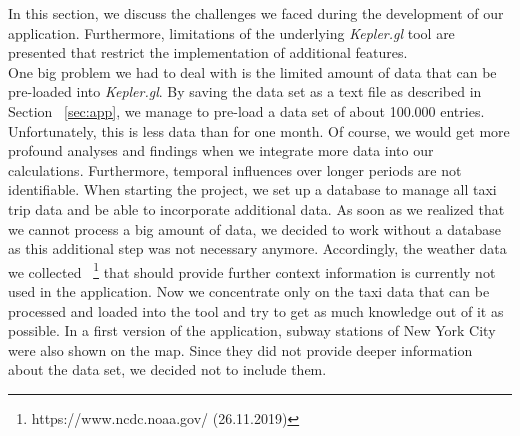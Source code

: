 \documentclass[sigconf, authorversion, nonacm=true]{acmart}
\begin{document}
In this section, we discuss the challenges we faced during the development of our application. Furthermore, limitations of the underlying \textit{Kepler.gl} tool are presented that restrict the implementation of additional features.\\
One big problem we had to deal with is the limited amount of data that can be pre-loaded into \textit{Kepler.gl}. By saving the data set as a text file as described in Section ~\ref{sec:app}, we manage to pre-load a data set of about 100.000 entries. Unfortunately, this is less data than for one month. Of course, we would get more profound analyses and findings when we integrate more data into our calculations. Furthermore, temporal influences over longer periods are not identifiable. When starting the project, we set up a database to manage all taxi trip data and be able to incorporate additional data. As soon as we realized that we cannot process a big amount of data, we decided to work without a database as this additional step was not necessary anymore. Accordingly, the weather data we collected ~\footnote{https://www.ncdc.noaa.gov/ (26.11.2019)} that should provide further context information is currently not used in the application. Now we concentrate only on the taxi data that can be processed and loaded into the tool and try to get as much knowledge out of it as possible. In a first version of the application, subway stations of New York City were also shown on the map. Since they did not provide deeper information about the data set, we decided not to include them.\\
\end{document}
